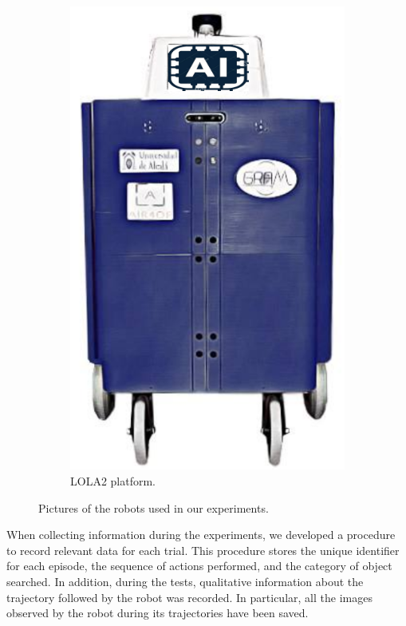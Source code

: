 \begin{figure}
\begin{subfigure}[b]{0.4\textwidth}
        \includegraphics[width=\textwidth]{figures/ros4vsn/lola2}
        \caption{LOLA2 platform.}
        \label{fig:robot_lola}
    \end{subfigure}
    \caption{Pictures of the robots used in our experiments.}\label{fig:robots}
\end{figure}

When collecting information during the experiments, we developed a procedure to record relevant data for each trial.
This procedure stores the unique identifier for each episode, the sequence of actions performed, and the category of object searched.
In addition, during the tests, qualitative information about the trajectory followed by the robot was recorded.
In particular, all the images observed by the robot during its trajectories have been saved.

